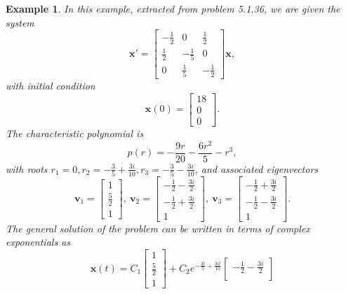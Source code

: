 \documentclass[11pt]{amsart}
\newtheorem{example}{Example}
\numberwithin{equation}{section}
\begin{document}
\begin{example}
In this example, extracted from problem 5.1.36, we are given the system 
\begin{equation*}
\mathbf{x}' =
\begin{bmatrix}
-\frac{1}{2} & 0 & \frac{1}{2}\\
\frac{1}{2} & -\frac{1}{5} & 0\\
0 & \frac{1}{5} & -\frac{1}{2}
\end{bmatrix} \mathbf{x},
\end{equation*}
with initial condition 
\begin{equation*}
\mathbf{x}(0) =
\begin{bmatrix}
18 \\
0 \\
0
\end{bmatrix}.
\end{equation*}
The characteristic polynomial is 
\begin{equation*}
p(r)=-\frac{9r}{20}-\frac{6r^2}{5}-r^3,
\end{equation*}
with roots $r_1=0, r_2=-\frac{3}{5}+\frac{3i}{10}, r_3=-\frac{3}{5}-\frac{3i}{10}$, and associated eigenvectors
\begin{equation*}
\mathbf{v}_1 =
\begin{bmatrix}
1 \\
\frac{5}{2} \\
1
\end{bmatrix}, \ \mathbf{v}_2 =
\begin{bmatrix}
-\frac{1}{2}-\frac{3i}{2} \\
-\frac{1}{2}+\frac{3i}{2}\\
1
\end{bmatrix}, \ \mathbf{v}_3 =
\begin{bmatrix}
-\frac{1}{2}+\frac{3i}{2} \\
-\frac{1}{2}-\frac{3i}{2}\\
1
\end{bmatrix}.
\end{equation*}
The general solution of the problem can be written in terms of complex exponentials as
\begin{equation*}
\mathbf{x}(t) = C_1
\begin{bmatrix}
1 \\
\frac{5}{2} \\
1
\end{bmatrix}+ C_2e^{-\frac{3t}{5}+\frac{3it}{10}}
\begin{bmatrix}
-\frac{1}{2}-\frac{3i}{2} \\

\end{bmatrix}
\end{equation*}
\end{example}
\end{document}

